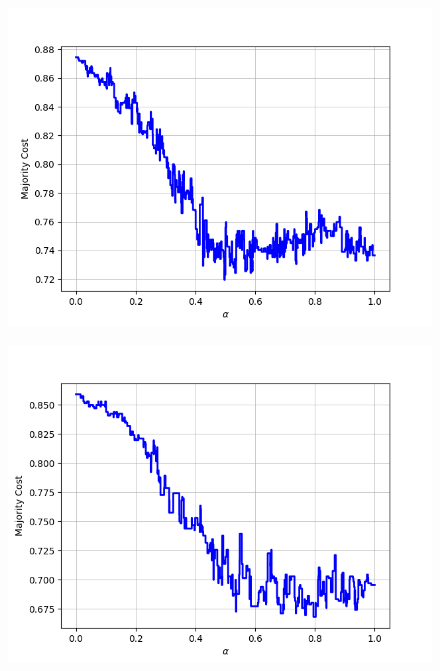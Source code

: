 \begin{figure}[h]
\begin{minipage}{.19\textwidth}
  {\includegraphics[width=\linewidth]{plots/omniglot-intra-ac/Malay_(Jawi_-_Arabic)}}
\end{minipage}
\begin{minipage}{.19\textwidth}
  \centering
  {\includegraphics[width=\linewidth]{plots/omniglot-intra-ac/Mkhedruli_(Georgian)}}
\end{minipage}
\begin{minipage}{.19\textwidth}
  \centering

\end{minipage}
\end{figure}

